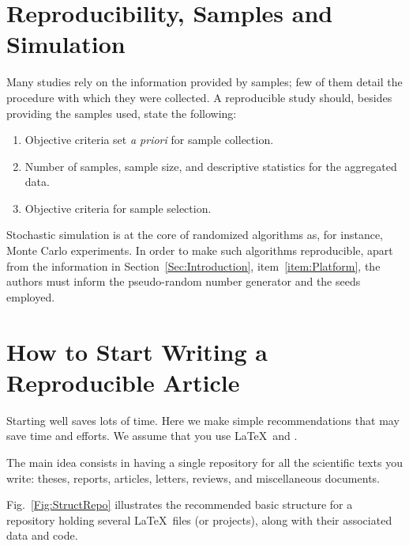 \documentclass[journal,twopage]{IEEEtran}
\begin{document}
\section{Reproducibility, Samples and Simulation}

Many studies rely on the information provided by samples;
few of them detail the procedure with which they were collected.
A reproducible study should, besides providing the samples used, state the following:
\begin{enumerate}
	\item Objective criteria set \textit{a priori} for sample collection.
	\item Number of samples, sample size, and descriptive statistics for the aggregated data.
	\item Objective criteria for sample selection.
\end{enumerate}

Stochastic simulation is at the core of randomized algorithms as, for instance, Monte Carlo experiments.
In order to make such algorithms reproducible, apart from the information in Section~\ref{Sec:Introduction}, item~\ref{item:Platform}, the authors must inform the pseudo-random number generator and the seeds employed.

\section{How to Start Writing a Reproducible Article}

Starting well saves lots of time.
Here we make simple recommendations that may save time and efforts.
We assume that you use \LaTeX\ and \BibTeX.

The main idea consists in having a single repository for all the scientific texts you write: 
theses, 
reports, 
articles, 
letters,
reviews,
and miscellaneous documents.

Fig.~\ref{Fig:StructRepo} illustrates the recommended basic structure for a repository holding several \LaTeX\ files (or projects), along with their associated data and code.
\end{document}
